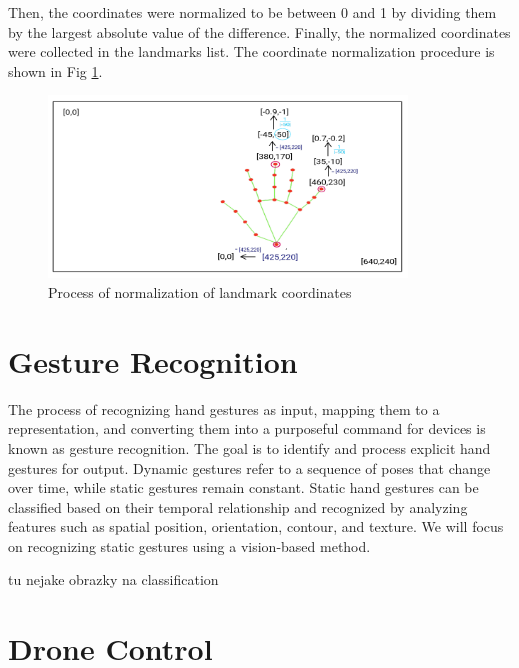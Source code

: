  Then, the coordinates were normalized to be between 0 and 1 by dividing them by the largest absolute value of the difference. Finally, the normalized coordinates were collected in the landmarks list. The coordinate normalization procedure is shown in Fig \ref{fig:normalization}.
\begin{figure}
	\centering
	\includegraphics[width = 0.85\textwidth]{images/normalise.pdf}
	\caption{Process of normalization of landmark coordinates}
	\label{fig:normalization}
\end{figure}




\section{Gesture Recognition}

The process of recognizing hand gestures as input, mapping them to a representation, and converting them into a purposeful command for devices is known as gesture recognition. The goal is to identify and process explicit hand gestures for output. 
Dynamic gestures refer to a sequence of poses that change over time, while static gestures remain constant. Static hand gestures can be classified based on their temporal relationship and recognized by analyzing features such as spatial position, orientation, contour, and texture. We will focus on recognizing static gestures using a vision-based method.


tu nejake obrazky na classification

\section{Drone Control}



